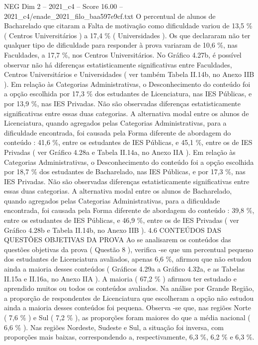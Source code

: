 \begin{textsample}{NEG Dim 2 – 2021\_c4 – Score 16.00 – 2021\_c4/enade\_2021\_filo\_baa597e9cf.txt}
O percentual de alunos de Bacharelado que citaram a Falta de motivação como dificuldade variou de 13,5 \% ( Centros Universitários ) a 17,4 \% ( Universidades ).
Os que declararam não ter qualquer tipo de dificuldade para responder à prova variaram de 10,6 \%, nas Faculdades, a 17,7 \%, nos Centros Universitários.
No Gráfico 4.27b, é possível observar não há diferenças estatisticamente significativas entre Faculdades, Centros Universitários e Universidades ( ver também Tabela II.14b, no Anexo IIB ).
Em relação às Categorias Administrativas, o Desconhecimento do conteúdo foi a opção escolhida por 17,3 \% dos estudantes de Licenciatura, nas IES Públicas, e por 13,9 \%, nas IES Privadas.
Não são observadas diferenças estatisticamente significativas entre essas duas categorias.
A alternativa modal entre os alunos de Licenciatura, quando agregados pelas Categorias Administrativas, para a dificuldade encontrada, foi causada pela Forma diferente de abordagem do conteúdo : 41,6 \%, entre os estudantes de IES Públicas, e 45,1 \%, entre os de IES Privadas ( ver Gráfico 4.28a e Tabela II.14a, no Anexo IIA ).
Em relação às Categorias Administrativas, o Desconhecimento do conteúdo foi a opção escolhida por 18,7 \% dos estudantes de Bacharelado, nas IES Públicas, e por 17,3 \%, nas IES Privadas.
Não são observadas diferenças estatisticamente significativas entre essas duas categorias.
A alternativa modal entre os alunos de Bacharelado, quando agregados pelas Categorias Administrativas, para a dificuldade encontrada, foi causada pela Forma diferente de abordagem do conteúdo : 39,8 \%, entre os estudantes de IES Públicas, e 46,9 \%, entre os de IES Privadas ( ver Gráfico 4.28b e Tabela II.14b, no Anexo IIB ). 4.6 CONTEÚDOS DAS QUESTÕES OBJETIVAS DA PROVA Ao se analisarem os conteúdos das questões objetivas da prova ( Questão 8 ), verifica -se que um percentual pequeno dos estudantes de Licenciatura avaliados, apenas 6,6 \%, afirmou que não estudou ainda a maioria desses conteúdos ( Gráficos 4.29a a Gráfico 4.32a, e as Tabelas II.15a e II.16a, no Anexo IIA ).
A maioria ( 67,2 \% ) afirmou ter estudado e aprendido muitos ou todos os conteúdos avaliados.
Na análise por Grande Região, a proporção de respondentes de Licenciatura que escolheram a opção não estudou ainda a maioria desses conteúdos foi pequena.
Observa -se que, nas regiões Norte ( 7,6 \% ) e Sul ( 7,2 \% ), as proporções foram maiores do que a média nacional ( 6,6 \% ).
Nas regiões Nordeste, Sudeste e Sul, a situação foi inversa, com proporções mais baixas, correspondendo a, respectivamente, 6,3 \%, 6,2 \% e 6,3 \%.

\end{textsample}
